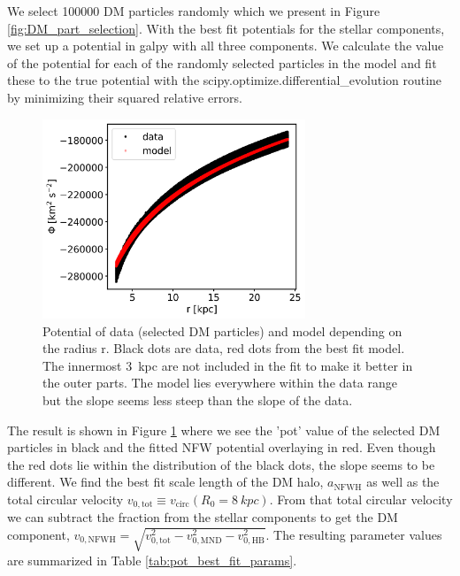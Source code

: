 We select 100000 \ac{DM} particles randomly which we present in Figure \ref{fig:DM_part_selection}. With the best fit potentials for the stellar components, we set up a potential in galpy with all three components. We calculate the value of the potential for each of the randomly selected particles in the model and fit these to the true potential with the scipy.optimize.differential\_evolution routine by minimizing their squared relative errors.
\begin{figure}
\captionsetup{format=plain}
    \centering
    \includegraphics[width=0.7\textwidth]{plots/Auriga/phi_model_and_data_snap_127.png}
    \caption{Potential of data (selected \ac{DM} particles) and model depending on the radius r. Black dots are data, red dots from the best fit model. The innermost \SI{3}{kpc} are not included in the fit to make it better in the outer parts. The model lies everywhere within the data range but the slope seems less steep than the slope of the data.}
    \label{fig:potential_best_fit}
\end{figure}
The result is shown in Figure \ref{fig:potential_best_fit} where we see the 'pot' value of the selected \ac{DM} particles in black and the fitted \ac{NFW} potential overlaying in red. Even though the red dots lie within the distribution of the black dots, the slope seems to be different. We find the best fit scale length of the \ac{DM} halo, $a_{\mathrm{NFWH}}$ as well as the total circular velocity $v_{0,\mathrm{tot}} \equiv v_{\mathrm{circ}}(R_0 = \SI{8}{kpc}) $. From that total circular velocity we can subtract the fraction from the stellar components to get the \ac{DM} component, $v_{0,\mathrm{NFWH}} = \sqrt{v_{0,\mathrm{tot}}^2 - v_{0, \mathrm{MND}}^2 - v_{0, \mathrm{HB}}^2}$. The resulting parameter values are summarized in Table \ref{tab:pot_best_fit_params}. 

